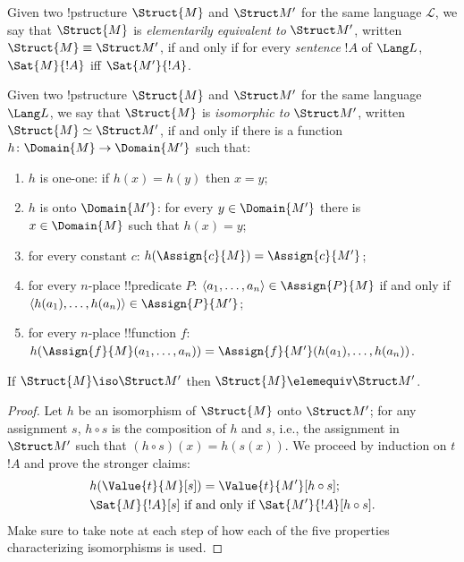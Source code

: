 \documentclass[../../include/open-logic-section]{subfiles}
\begin{document}

\begin{defn}
  Given two !p{structure} $\Struct{M}$ and $\Struct M'$ for the same
  language $\mathcal{L}$, we say that $\Struct{M}$ is
  \emph{elementarily equivalent to} $\Struct M'$, written $\Struct{M}
  \equiv \Struct M'$, if and only if for every \emph{sentence} $!A$ of
  $\Lang L$, $\Sat{M}{!A}$ iff $\Sat{M'}{!A}$.
\end{defn}

\begin{defn}
  Given two !p{structure} $\Struct{M}$ and $\Struct M'$ for the same
  language $\Lang L$, we say that    $\Struct{M}$ is
  \emph{isomorphic to} $\Struct M'$, written
  $\Struct{M} \simeq \Struct M'$, if and only if there is a
  function $h\colon \Domain{M} \to \Domain{M'}$ such that:
  \begin{enumerate}
  \item $h$ is one-one: if $h(x) =
    h(y)$ then $x = y$; 
  \item $h$ is onto $\Domain{M'}$: for every $y \in
    \Domain{M'}$ there is $x \in \Domain{M}$ such that $h(x) = y$;
  \item for every constant $c$: $h(\Assign{c}{M}) =
    \Assign{c}{M'}$; 
  \item for every $n$-place !!{predicate} $P$: $\langle
    a_1,\dots,a_n\rangle \in \Assign{P}{M}$ if and only if  $\langle
    h(a_1),\dots,h(a_n)\rangle \in \Assign{P}{M'}$;
  \item for every $n$-place !!{function} $f$:
    $h(\Assign{f}{M}(a_1,\dots,a_n)) =
    \Assign{f}{M'}(h(a_1),\ldots,h(a_n))$.
 \end{enumerate}
\end{defn}

\begin{thm}
  If $\Struct{M} \iso \Struct M'$ then $\Struct{M} \elemequiv
  \Struct M'$.
\end{thm}

\begin{proof}
  Let $h$ be an isomorphism of $\Struct{M}$ onto
  $\Struct M'$; for any assignment $s$, $h \circ s$ is the
  composition of $h$ and $s$, i.e., the assignment in
  $\Struct M'$ such that  $(h \circ s)(x) = h(s(x))$.
  We proceed by induction on $t$ $!A$ and prove the stronger claims: 
  \begin{align*}
  &  h(\Value{t}{M}[s]) = \Value{t}{M'}[h\circ s];\\
  &  \Sat{M}{!A}[s] \text{ if and only if }
    \Sat{M'}{!A}[h \circ s].
  \end{align*}
Make sure to take note at each step of how each of the five properties
characterizing isomorphisms is used.    
\end{proof}
\end{document}
